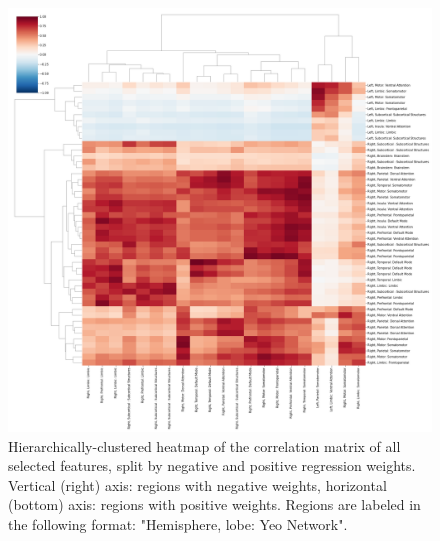 \documentclass[10pt]{article}
\begin{document}
\begin{figure}[ht]
\centering
\includegraphics[width=1\linewidth]{figures/heatmap_shen268_correlation_pos_vs_neg.png}
\caption{Hierarchically-clustered heatmap of the correlation matrix of all selected features, split by negative and positive regression weights. Vertical (right) axis: regions with negative weights, horizontal (bottom) axis: regions with positive weights.  Regions are labeled in the following format: "Hemisphere, lobe: Yeo Network".}
\label{heatmap_shen_pos_vs_negative}
\end{figure}
\end{document}
